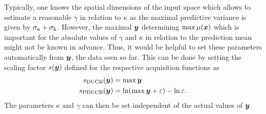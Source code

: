 Typically, one knows the spatial dimensions of the input space which allows to 
estimate a reasonable $\gamma$ in relation to $\kappa$ as the maximal predictive 
variance is given by $\sigma_{\mathrm{n}} + \sigma_{\mathrm{k}}$.  However, the maximal $\bm{y}$ determining $\max \mu(\bm{x})$ which is important for the absolute values of 
$\gamma$ and $\kappa$ in relation to the prediction mean might not be known in 
advance.  Thus, it would be helpful to set these parameters automatically from 
$\bm{y}$, the data seen so far.  This can be done by setting the scaling factor 
$s(\bm{y})$ defined for the respective acquisition functions as
\begin{align}
    s_{\mathrm{DUCB}}(\bm{y}) &= \max \bm{y} \label{eqn:scale-ducb}\\
    s_{\mathrm{PDUCB}}(\bm{y}) &= \ln(\max \bm{y} + \varepsilon) - \ln \varepsilon 
    \text{.} \label{eqn:scale-pducb}
\end{align}
The parameters $\kappa$ and $\gamma$ can then be set independent of the actual 
values of $\bm{y}$.


